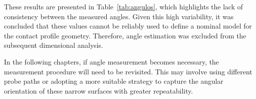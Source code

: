 These results are presented in Table~\ref{tab:angulos}, which highlights the lack of consistency between the measured angles. Given this high variability, it was concluded that these values cannot be reliably used to define a nominal model for the contact profile geometry. Therefore, angle estimation was excluded from the subsequent dimensional analysis.

In the following chapters, if angle measurement becomes necessary, the measurement procedure will need to be revisited. This may involve using different probe paths or adopting a more suitable strategy to capture the angular orientation of these narrow surfaces with greater repeatability.
